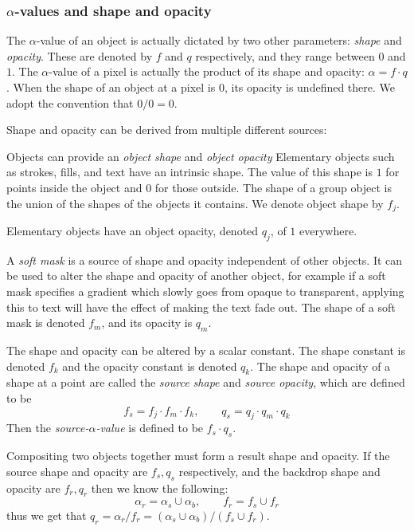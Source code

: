 \subsubsection{$\alpha$-values and shape and opacity}

The $\alpha$-value of an object is actually dictated by two other parameters: {\it shape} and {\it opacity}.
These are denoted by $f$ and $q$ respectively, and they range between $0$ and $1$.
The $\alpha$-value of a pixel is actually the product of its shape and opacity: $\alpha=f\cdot q$.
When the shape of an object at a pixel is $0$, its opacity is undefined there.
We adopt the convention that $0/0=0$.

Shape and opacity can be derived from multiple different sources:
\blist
    \item Objects can provide an {\it object shape} and {\it object opacity}
    Elementary objects such as strokes, fills, and text have an intrinsic shape.
    The value of this shape is $1$ for points inside the object and $0$ for those outside.
    The shape of a group object is the union of the shapes of the objects it contains.
    We denote object shape by $f_j$.

    Elementary objects have an object opacity, denoted $q_j$, of $1$ everywhere.
    \item A {\it soft mask} is a source of shape and opacity independent of other objects.
    It can be used to alter the shape and opacity of another object, for example if a soft mask specifies a
    gradient which slowly goes from opaque to transparent, applying this to text will have the effect of making
    the text fade out.
    The shape of a soft mask is denoted $f_m$, and its opacity is $q_m$.
    \item The shape and opacity can be altered by a scalar constant.
    The shape constant is denoted $f_k$ and the opacity constant is denoted $q_k$.
\elist
The shape and opacity of a shape at a point are called the {\it source shape} and {\it source opacity}, which
are defined to be
$$ f_s = f_j\cdot f_m\cdot f_k,\qquad q_s = q_j\cdot q_m\cdot q_k $$
Then the {\it source-$\alpha$-value} is defined to be $f_s\cdot q_s$.

Compositing two objects together must form a result shape and opacity.
If the source shape and opacity are $f_s,q_s$ respectively, and the backdrop shape and opacity are $f_r,q_r$
then we know the following:
$$ \alpha_r = \alpha_s\cup\alpha_b,\qquad f_r = f_s\cup f_r $$
thus we get that $q_r=\alpha_r/f_r=(\alpha_s\cup\alpha_b)/(f_s\cup f_r)$.

